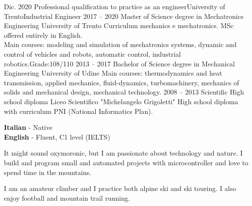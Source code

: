 \documentclass[9pt]{developercv_mattia} %
\begin{document}
%
%
%
\begin{entrylist}
	\entry
		{Dic. 2020}
		{Professional qualification to practice as an engineer}{University of Trento}{Industrial Engineer}
	\entry
		{2017 -- 2020}
		{Master of Science degree in Mechatronics Engineering}
		{University of Trento}
		{Curriculum mechanics e mechatronics. MSc offered entirely in English.\\
		Main courses: modeling and simulation of mechatronics systems, dynamic and control of vehicles and robots, automatic control, industrial robotics.\hfill Grade:108/110}
	\entry
		{2013 -- 2017}
		{Bachelor of Science degree in Mechanical Engineering}
		{University of Udine}
		{Main courses: thermodynamics and heat transmission, applied mechanics, fluid-dynamics, turbomachinery, mechanics of solids and mechanical design, mechanical technology.} %
	\entry
		{2008 -- 2013}
		{Scientific High school diploma}
		{Liceo Scientifico "Michelangelo Grigoletti"}
		{High school diploma with curriculum PNI (National Informatics Plan). } %
\end{entrylist}
%
%
\begin{minipage}[t]{0.27\textwidth}
	\vspace{-\baselineskip} %
%
	\textbf{Italian} - Native\\
	\textbf{English}  - Fluent, C1 level (IELTS)
%
\end{minipage}
\hfill
\begin{minipage}[t]{0.38\textwidth}
	\vspace{-\baselineskip} %
	It might sound oxymoronic, but I am passionate about technology and nature. 
	I build and program small and automated projects with microcontroller and love to spend time in the mountains.
%
\end{minipage}
\hfill
\begin{minipage}[t]{0.27\textwidth}
	\vspace{-\baselineskip} %
%
	I am an amateur climber and I practice both alpine ski and ski touring. I also enjoy football and mountain trail running. 
%
\end{minipage}

\vfill
\end{document}
